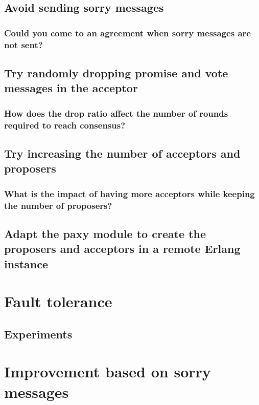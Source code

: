 \documentclass[a4paper, 10pt]{article}
\begin{document}
\subsection{Avoid sending sorry messages}

\subsubsection{Could you come to an agreement when sorry messages are not sent?}

\subsection{Try randomly dropping promise and vote messages in the acceptor}

\subsubsection{How does the drop ratio affect the number of rounds required to reach consensus?}

\subsection{Try increasing the number of acceptors and proposers}

\subsubsection{What is the impact of having more acceptors while keeping the number of proposers?}

\subsection{Adapt the paxy module to create the proposers and acceptors in a remote Erlang instance}



\section{Fault tolerance}

\subsection{Experiments}

\section{Improvement based on sorry messages}
\end{document}
